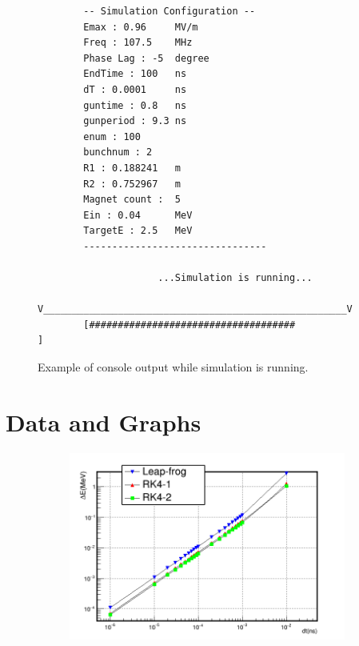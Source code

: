 \documentclass[a4paper,oneside,12pt]{report}
\numberwithin{equation}{chapter}
\begin{document}
{\begin{figure}[H]
    \centering
    \begin{verbatim}
        -- Simulation Configuration --
        Emax : 0.96     MV/m
        Freq : 107.5    MHz
        Phase Lag : -5  degree
        EndTime : 100   ns
        dT : 0.0001     ns
        guntime : 0.8   ns
        gunperiod : 9.3 ns
        enum : 100
        bunchnum : 2
        R1 : 0.188241   m
        R2 : 0.752967   m
        Magnet count :  5
        Ein : 0.04      MeV
        TargetE : 2.5   MeV
        --------------------------------
        
                     ...Simulation is running...
        V_____________________________________________________V
        [####################################                 ]
    \end{verbatim}
    \vspace{0pt}
\caption{Example of console output while simulation is running.}
\label{fig:console_output_running}
\end{figure}

\chapter{Data and Graphs}\label{appendix:data_graph}
\vspace{30pt}
\iffalse \begin{figure}[H]
    \centering
    \begin{subfigure}{0.9\textwidth}
        \centering
        \includegraphics[width=\linewidth]{./figures/analiz/lf_rk1_rk2_dt-E_3.png}
    \end{subfigure}
    

\end{figure}}
\end{document}
